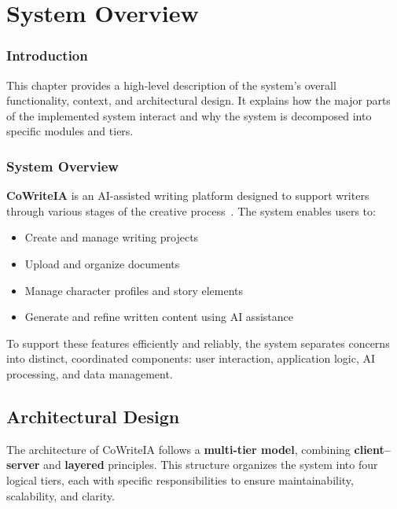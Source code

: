 \chapter{System Overview}

\subsection*{Introduction}
This chapter provides a high-level description of the system's overall functionality, context, and architectural design. It explains how the major parts of the implemented system interact and why the system is decomposed into specific modules and tiers.

\subsection*{System Overview}
\textbf{CoWriteIA} is an AI-assisted writing platform designed to support writers through various stages of the creative process~\cite{notionai,grammarly,scrivener}. The system enables users to:

\begin{itemize}
    \item Create and manage writing projects
    \item Upload and organize documents
    \item Manage character profiles and story elements
    \item Generate and refine written content using AI assistance
\end{itemize}

To support these features efficiently and reliably, the system separates concerns into distinct, coordinated components: user interaction, application logic, AI processing, and data management.

\section{Architectural Design}

The architecture of CoWriteIA follows a \textbf{multi-tier model}, combining \textbf{client–server} and \textbf{layered} principles. This structure organizes the system into four logical tiers, each with specific responsibilities to ensure maintainability, scalability, and clarity.

